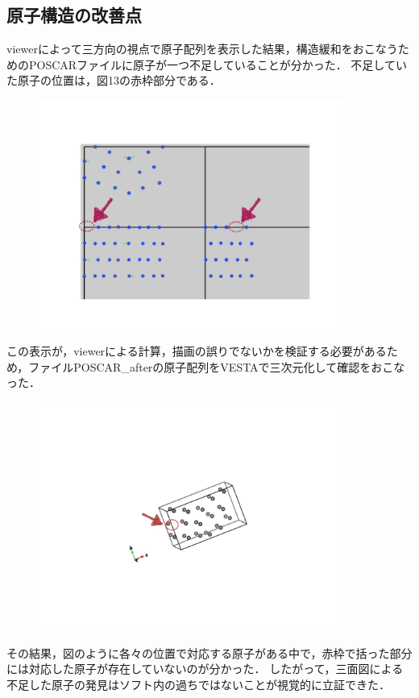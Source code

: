 \subsection{原子構造の改善点}
viewerによって三方向の視点で原子配列を表示した結果，構造緩和をおこなうためのPOSCARファイルに原子が一つ不足していることが分かった．
不足していた原子の位置は，図13の赤枠部分である．

\begin{figure}[htbp]\begin{center}
\includegraphics[width=10cm,bb= 0 0 737 553]{../figs/./boundary_narita.013.jpeg}
\caption{}
\label{default}\end{center}\end{figure}
この表示が，viewerによる計算，描画の誤りでないかを検証する必要があるため，ファイルPOSCAR\_afterの原子配列をVESTAで三次元化して確認をおこなった．

\begin{figure}[htbp]\begin{center}
\includegraphics[width=10cm,bb= 0 0 737 553]{../figs/./boundary_narita.018.jpeg}
\caption{}
\label{default}\end{center}\end{figure}
その結果，図のように各々の位置で対応する原子がある中で，赤枠で括った部分には対応した原子が存在していないのが分かった．
したがって，三面図による不足した原子の発見はソフト内の過ちではないことが視覚的に立証できた．

